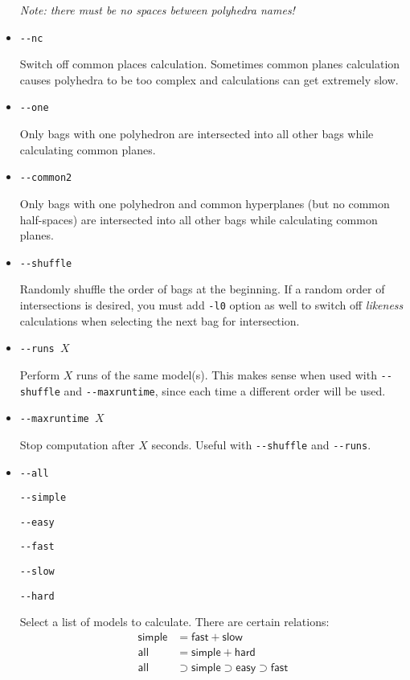 \documentclass[a4paper,11pt]{article}
\begin{document}
\begin{itemize}
\emph{Note: there must be no spaces between polyhedra names!}

\item \texttt{-{}-nc}\par
Switch off common places calculation.  Sometimes common planes
calculation causes polyhedra to be too complex and calculations can get
extremely slow.

\item \texttt{-{}-one}\par
Only bags with one polyhedron are intersected into all other bags
while calculating common planes.

\item \texttt{-{}-common2}\par
Only bags with one polyhedron and common hyperplanes (but no common half-spaces)
are intersected into all other bags
while calculating common planes.

\item \texttt{-{}-shuffle}\par
Randomly shuffle the order of bags at the beginning.
If a random order of intersections is desired, you must add \texttt{-l0}
option as well to switch off \emph{likeness} calculations when selecting
the next bag for intersection.

\item \texttt{-{}-runs~$X$}\par
Perform $X$ runs of the same model(s).
This makes sense when used with \texttt{-{}-shuffle} and \texttt{-{}-maxruntime},
since each time a different
order will be used.

\item \texttt{-{}-maxruntime~$X$}\par
Stop computation after $X$ seconds. Useful with \texttt{-{}-shuffle} and \texttt{-{}-runs}.

\item \texttt{-{}-all}\par
\texttt{-{}-simple}\par
\texttt{-{}-easy}\par
\texttt{-{}-fast}\par
\texttt{-{}-slow}\par
\texttt{-{}-hard}\par
Select a list of models to calculate. There are certain relations:
\begin{align*}
\textsf{simple} &= \textsf{fast} + \textsf{slow}  \\
\textsf{all} &= \textsf{simple} + \textsf{hard}  \\
\textsf{all} &\supset \textsf{simple} \supset \textsf{easy} \supset \textsf{fast}
\end{align*}


\end{itemize}
\end{document}
